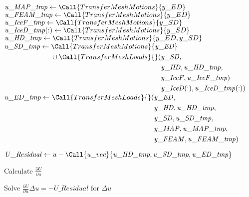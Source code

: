 \documentclass[10pt,letterpaper,oneside,notitlepage]{article}
\begin{document}
\begin{algorithmic}[1]
		\State$\mathit{u\_MAP\_tmp} \gets \Call{TransferMeshMotions}{y\_ED}$
		\State$\mathit{u\_FEAM\_tmp} \gets \Call{TransferMeshMotions}{y\_ED}$
		\State$\mathit{u\_IceF\_tmp} \gets \Call{TransferMeshMotions}{y\_SD}$
		\State$\mathit{u\_IceD\_tmp(:)} \gets \Call{TransferMeshMotions}{y\_SD}$
		\State$\mathit{u\_HD\_tmp} \gets \Call{TransferMeshMotions}{y\_ED,y\_SD}$
		\State$\mathit{u\_SD\_tmp} \gets \!
				\begin{aligned}[t]
           & \Call{TransferMeshMotions}{\mathit{y\_ED}}  \\
					 & \cup \Call{TransferMeshLoads}{}(\!
					    \begin{aligned}[t] 
							   & \mathit{y\_SD}, \\
							   & \mathit{y\_HD},\mathit{u\_HD\_tmp}, \\
					       & \mathit{y\_IceF},\mathit{u\_IceF\_tmp}) \\
					       & \mathit{y\_IceD(:)},\mathit{u\_IceD\_tmp(:)}) \\
							\end{aligned}
			\end{aligned}$
		\State$\mathit{u\_ED\_tmp} \gets \Call{TransferMeshLoads}{}( \!
				     \begin{aligned}[t]   & \mathit{y\_ED}, \\
																  & \mathit{y\_HD},  \mathit{u\_HD\_tmp},  \\
																  & \mathit{y\_SD},  \mathit{u\_SD\_tmp},  \\  
																	& \mathit{y\_MAP}, \mathit{u\_MAP\_tmp}, \\ 
																	& \mathit{y\_FEAM},\mathit{u\_FEAM\_tmp} )
							\end{aligned}$

		\State
		\State$\mathit{U\_Residual} \gets u - \Call{u\_vec}{\mathit{u\_HD\_tmp},\mathit{u\_SD\_tmp},\mathit{u\_ED\_tmp}}$
		\State
		
			\State Calculate $\frac{\partial U}{\partial u}$
		\EndIf
		

		\State Solve  $\frac{\partial U}{\partial u} \Delta u = - \mathit{U\_Residual}$ for $\Delta u$


\end{algorithmic}
\end{document}
